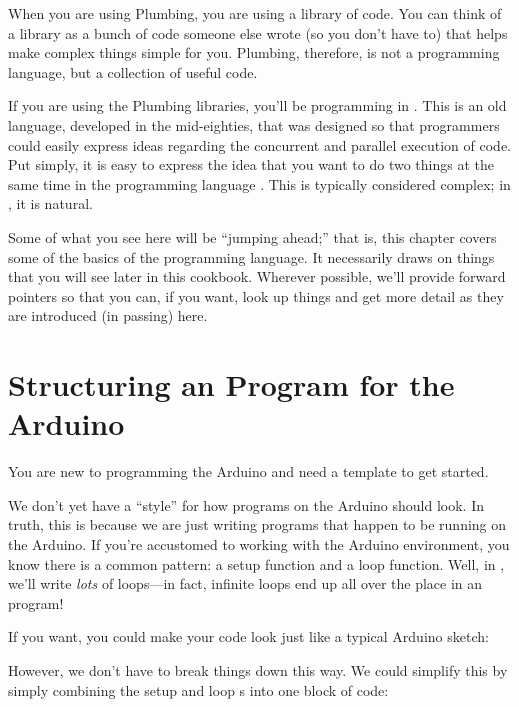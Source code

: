 When you are using Plumbing, you are using a library of code. You can think of a library as a bunch of code someone else wrote (so you don't have to) that helps make complex things simple for you. Plumbing, therefore, is not a programming language, but a collection of useful code.

If you are using the Plumbing libraries, you'll be programming in \occam. This is an old language, developed in the mid-eighties, that was designed so that programmers could easily express ideas regarding the concurrent and parallel execution of code. Put simply, it is easy to express the idea that you want to do two things at the same time in the programming language \occam. This is typically considered complex; in \occam, it is natural.

Some of what you see here will be ``jumping ahead;'' that is, this chapter covers some of the basics of the \occam programming language. It necessarily draws on things that you will see later in this cookbook. Wherever possible, we'll provide forward pointers so that you can, if you want, look up things and get more detail as they are introduced (in passing) here. 

% 
\section{Structuring an \occam Program for the Arduino\label{structuring-for-arduino}}

\problem
You are new to programming the Arduino and need a template to get started.

\solution
We don't yet have a ``style'' for how \occam programs on the Arduino should look. In truth, this is because we are just writing \occam programs that happen to be running on the Arduino. If you're accustomed to working with the Arduino environment, you know there is a common pattern: a {\code setup} function and a {\code loop} function. Well, in \occam, we'll write \emph{lots} of loops---in fact, infinite loops end up all over the place in an \occam program!

If you want, you could make your code look just like a typical Arduino sketch:



However, we don't have to break things down this way. We could simplify this by simply combining the {\code setup} and {\code loop} {\PROC}s into one block of code:

